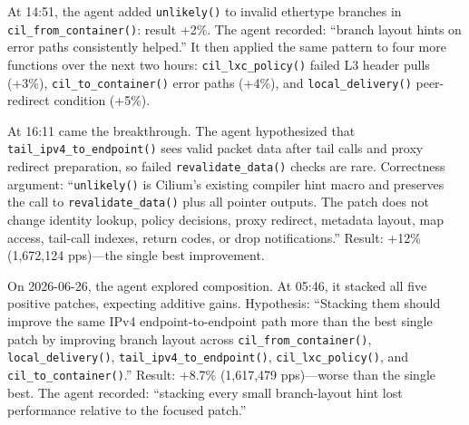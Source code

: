 \documentclass[sigplan,10pt,anonymous,nonacm]{acmart}
\begin{document}
At 14:51, the agent added \texttt{unlikely()} to invalid ethertype branches in \texttt{cil\_from\_container()}: result +2\%. The agent recorded: ``branch layout hints on error paths consistently helped.'' It then applied the same pattern to four more functions over the next two hours: \texttt{cil\_lxc\_policy()} failed L3 header pulls (+3\%), \texttt{cil\_to\_container()} error paths (+4\%), and \texttt{local\_delivery()} peer-redirect condition (+5\%).

At 16:11 came the breakthrough. The agent hypothesized that \texttt{tail\_ipv4\_to\_endpoint()} sees valid packet data after tail calls and proxy redirect preparation, so failed \texttt{revalidate\_data()} checks are rare. Correctness argument: ``\texttt{unlikely()} is Cilium's existing compiler hint macro and preserves the call to \texttt{revalidate\_data()} plus all pointer outputs. The patch does not change identity lookup, policy decisions, proxy redirect, metadata layout, map access, tail-call indexes, return codes, or drop notifications.'' Result: +12\% (1,672,124 pps)---the single best improvement.

On 2026-06-26, the agent explored composition. At 05:46, it stacked all five positive patches, expecting additive gains. Hypothesis: ``Stacking them should improve the same IPv4 endpoint-to-endpoint path more than the best single patch by improving branch layout across \texttt{cil\_from\_container()}, \texttt{local\_delivery()}, \texttt{tail\_ipv4\_to\_endpoint()}, \texttt{cil\_lxc\_policy()}, and \texttt{cil\_to\_container()}.'' Result: +8.7\% (1,617,479 pps)---worse than the single best. The agent recorded: ``stacking every small branch-layout hint lost performance relative to the focused patch.''
\end{document}
